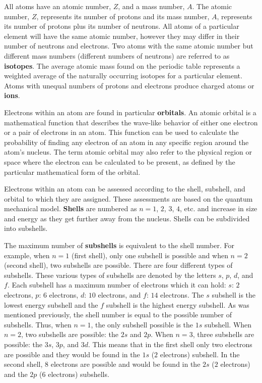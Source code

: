 \documentclass[a4paper,10pt]{article}
\begin{document}
{\noindent}All atoms have an atomic number, $Z$, and a mass number, $A$. The atomic number, $Z$, represents its number of protons and its mass number, $A$, represents its number of protons plus its number of neutrons. All atoms of a particular element will have the same atomic number, however they may differ in their number of neutrons and electrons. Two atoms with the same atomic number but different mass numbers (different numbers of neutrons) are referred to as \textbf{isotopes}. The average atomic mass found on the periodic table represents a weighted average of the naturally occurring isotopes for a particular element. Atoms with unequal numbers of protons and electrons produce charged atoms or \textbf{ions}.

{\noindent}Electrons within an atom are found in particular \textbf{orbitals}. An atomic orbital is a mathematical function that describes the wave-like behavior of either one electron or a pair of electrons in an atom. This function can be used to calculate the probability of finding any electron of an atom in any specific region around the atom's nucleus. The term atomic orbital may also refer to the physical region or space where the electron can be calculated to be present, as defined by the particular mathematical form of the orbital. 

{\noindent}Electrons within an atom can be assessed according to the shell, subshell, and orbital to which they are assigned. These assessments are based on the quantum mechanical model. \textbf{Shells} are numbered as $n=1$, $2$, $3$, $4$, etc. and increase in size and energy as they get further away from the nucleus. Shells can be subdivided into subshells.

{\noindent}The maximum number of \textbf{subshells} is equivalent to the shell number. For example, when $n=1$ (first shell), only one subshell is possible and when $n=2$ (second shell), two subshells are possible. There are four different types of subshells. These various types of subshells are denoted by the letters $s$, $p$, $d$, and $f$. Each subshell has a maximum number of electrons which it can hold: $s$: $2$ electrons, $p$: $6$ electrons, $d$: $10$ electrons, and $f$: $14$ electrons. The $s$ subshell is the lowest energy subshell and the $f$ subshell is the highest energy subshell. As was mentioned previously, the shell number is equal to the possible number of subshells. Thus, when $n=1$, the only subshell possible is the $1s$ subshell. When $n=2$, two subshells are possible: the $2s$ and $2p$. When $n=3$, three subshells are possible: the $3s$, $3p$, and $3d$. This means that in the first shell only two electrons are possible and they would be found in the $1s$ ($2$ electrons) subshell. In the second shell, $8$ electrons are possible and would be found in the $2s$ ($2$ electrons) and the $2p$ ($6$ electrons) subshells.
\end{document}
